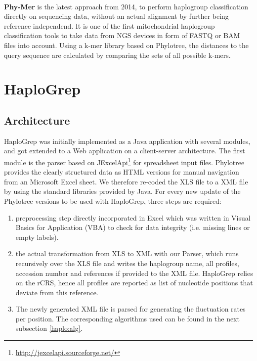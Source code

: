 \\
\textbf{Phy-Mer} is the latest approach from 2014, to perform haplogroup classification directly on sequencing data, without an actual alignment by further being reference independend. It is one of the first mitochondrial haplogroup classification tools to take data from NGS devices in form of FASTQ or BAM files into account. Using a k-mer library based on Phylotree, the distances to the query sequence are calculated by comparing the sets of all possible k-mers. \\

\section{HaploGrep}\label{hg:haplogrep}
\subsection{Architecture}
HaploGrep was initially implemented as a Java application with several modules, and got extended to a Web application on a client-server architecture. The first module is the parser based on JExcelApi\footnote{\url{http://jexcelapi.sourceforge.net/}} for spreadsheet input files. Phylotree provides the clearly structured data as HTML versions for manual navigation from an Microsoft Excel sheet. We therefore re-coded the XLS file to a XML file by using the standard libraries provided by Java. For every new update of the Phylotree versions to be used with HaploGrep, three steps are required: 
\begin{enumerate}
\item preprocessing step directly incorporated in Excel which was written in Visual Basics for Application (VBA) to check for data integrity (i.e. missing lines or empty labels). 
\item the actual transformation from XLS to XML with our Parser, which runs recursively over the XLS file and writes the haplogroup name, all profiles, accession number and references if provided to the XML file. HaploGrep relies on the rCRS, hence all profiles are reported as list of nucleotide positions that deviate from this reference. 
\item The newly generated XML file is parsed for generating the fluctuation rates per position. The corresponding algorithms used can be found in the next subsection \ref{haplo:alg}.
\end{enumerate}
